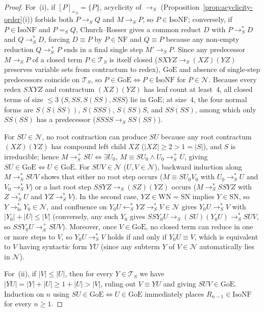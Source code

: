 \documentclass[11pt,reqno]{amsart}
\numberwithin{equation}{section}
\theoremstyle{plain}
\theoremstyle{definition}
\theoremstyle{remark}
\newcommand{\TS}{\mathcal{T}_S}
\newcommand{\NF}{\mathrm{NF}}
\newcommand{\SN}{\mathrm{SN}}
\newcommand{\WN}{\mathrm{WN}}
\newcommand{\redS}{\to_S}
\newcommand{\redSp}{\to_S^+}
\newcommand{\redSs}{\to_S^*}
\newcommand{\convS}{=_S}
\begin{document}
\begin{proof}
For~(i), if $[P]_{\convS} = \{P\}$, acyclicity of $\redS$ (Proposition~\ref{prop:acyclicity-order}(i)) forbids both $P \redS Q$ and $M \redS P$, so $P \in \mathrm{IsoNF}$; conversely, if $P \in \mathrm{IsoNF}$ and $P \convS Q$, Church--Rosser gives a common reduct $D$ with $P \redSs D$ and $Q \redSs D$, forcing $D \equiv P$ by $P \in \NF$ and $Q \equiv P$ because any non-empty reduction $Q \redSp P$ ends in a final single step $M' \redS P$. Since any predecessor $M \redS P$ of a closed term $P \in \TS$ is itself closed ($S X Y Z \redS (X Z)(Y Z)$ preserves variable sets from contractum to redex), $\mathrm{GoE}$ and absence of single-step predecessors coincide on $\TS$, so $P \in \mathrm{GoE} \iff P \in \mathrm{IsoNF}$ for $P \in \mathcal{N}$. Because every redex $S X Y Z$ and contractum $(X Z)(Y Z)$ has leaf count at least~$4$, all closed terms of size $\le 3$ ($S, S S, S(S S), S S S$) lie in $\mathrm{GoE}$; at size~$4$, the four normal forms are $S(S(S S))$, $S(S S S)$, $S(S S)S$, and $S S (S S)$, among which only $S S (S S)$ has a predecessor ($S S S S \redS S S (S S)$).

For $S U \in \mathcal{N}$, no root contraction can produce $S U$ because any root contractum $(X Z)(Y Z)$ has compound left child $X Z$ ($|X Z| \ge 2 > 1 = |S|$), and $S$ is irreducible; hence $M \redSp S U \iff \exists U_0,\, M \equiv S U_0 \land U_0 \redSp U$, giving $S U \in \mathrm{GoE} \iff U \in \mathrm{GoE}$. For $S U V \in \mathcal{N}$ ($U, V \in \mathcal{N}$), backward induction along $M \redSs S U V$ shows that either no root step occurs ($M \equiv S U_0 V_0$ with $U_0 \redSs U$ and $V_0 \redSs V$) or a last root step $S S Y Z \redS (S Z)(Y Z)$ occurs ($M \redSs S S Y Z$ with $Z \redSs U$ and $Y Z \redSs V$). In the second case, $Y Z \in \WN = \SN$ implies $Y \in \SN$, so $Y \to_{\mathrm{lo}}^* Y_0 \in \mathcal{N}$, and confluence on $Y_0 U \leftarrow_S^* Y Z \redSs V \in \mathcal{N}$ gives $Y_0 U \redSs V$ with $|Y_0| + |U| \le |V|$ (conversely, any such $Y_0$ gives $S S Y_0 U \redS (S U)(Y_0 U) \redSs S U V$, so $S S Y_0 U \redSp S U V$). Moreover, once $V \in \mathrm{GoE}$, no closed term can reduce in one or more steps to $V$, so $Y_0 U \redSs V$ holds if and only if $Y_0 U \equiv V$, which is equivalent to $V$ having syntactic form $Y U$ (since any subterm $Y$ of $V \in \mathcal{N}$ automatically lies in $\mathcal{N}$).

For~(ii), if $|V| \le |U|$, then for every $Y \in \TS$ we have $|Y U| = |Y| + |U| \ge 1 + |U| > |V|$, ruling out $V \equiv Y U$ and giving $S U V \in \mathrm{GoE}$. Induction on $n$ using $S U \in \mathrm{GoE} \iff U \in \mathrm{GoE}$ immediately places $R_{n-1} \in \mathrm{IsoNF}$ for every $n \ge 1$.


\end{proof}
\end{document}
